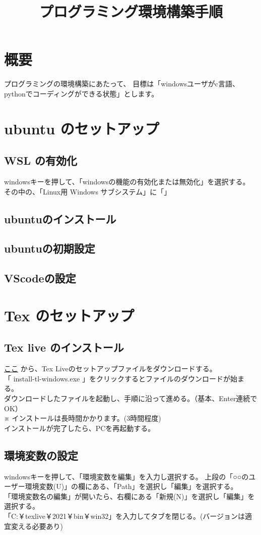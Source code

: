 \documentclass[a4paper]{jsarticle}
\author{}
\title{プログラミング環境構築手順}
\date{}
\begin{document}
\maketitle

\section*{\large 概要}
プログラミングの環境構築にあたって、
目標は「windowsユーザがc言語、pythonでコーディングができる状態」とします。
\section{\large ubuntu のセットアップ}
\subsection{WSL の有効化}
windowsキーを押して、「windowsの機能の有効化または無効化」を選択する。
その中の、「Linux用 Windows サブシステム」に「」
\subsection{ubuntuのインストール}
\subsection{ubuntuの初期設定}
\subsection{VScodeの設定}
\section{\large Tex のセットアップ}
\subsection{Tex live のインストール}
\textcolor{blue}{\href{http://www.tug.org/texlive/acquire-netinstall.html}{ここ}} から、Tex Liveのセットアップファイルをダウンロードする。\\
「 install-tl-windows.exe 」をクリックするとファイルのダウンロードが始まる。\\
ダウンロードしたファイルを起動し、手順に沿って進める。（基本、Enter連続でOK）\\
※ インストールは長時間かかります。(3時間程度)\\
インストールが完了したら、PCを再起動する。
\subsection{環境変数の設定}
windowsキーを押して、「環境変数を編集」を入力し選択する。
上段の「○○のユーザー環境変数(U)」の欄にある、「Path」を選択し「編集」を選択する。\\
「環境変数名の編集」が開いたら、右欄にある「新規(N)」を選択し「編集」を選択する。\\
「C:￥texlive￥2021￥bin￥win32」を入力してタブを閉じる。(バージョンは適宜変える必要あり)
\end{document}
